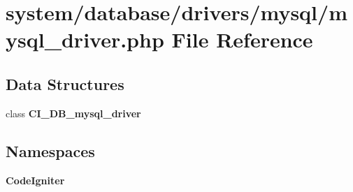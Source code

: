 \section{system/database/drivers/mysql/mysql\-\_\-driver.php File Reference}
\label{mysql__driver_8php}
\subsection*{Data Structures}
\begin{DoxyCompactItemize}
\item 
class {\bf C\-I\-\_\-\-D\-B\-\_\-mysql\-\_\-driver}
\end{DoxyCompactItemize}
\subsection*{Namespaces}
\begin{DoxyCompactItemize}
\item 
{\bf Code\-Igniter}
\end{DoxyCompactItemize}
